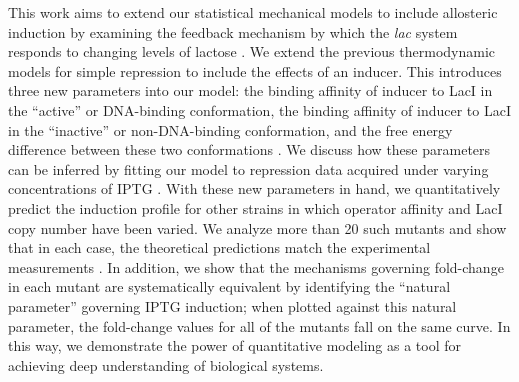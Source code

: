 This work aims to extend our statistical mechanical models to include
allosteric induction by examining the
feedback mechanism by which the \textit{lac} system responds to changing levels
of lactose \cite{JACOB1961}. We extend the previous thermodynamic models for
simple repression to include the effects of an inducer. This introduces three
new parameters into our model: the binding affinity of inducer to LacI in the
``active'' or DNA-binding conformation, the binding affinity of inducer to LacI
in the ``inactive'' or non-DNA-binding conformation, and the free energy
difference between these two conformations . We discuss how these parameters can
be inferred by fitting our model to repression data acquired under varying
concentrations of IPTG . With these new parameters in hand, we quantitatively
predict the induction profile for other strains in which operator affinity and
LacI copy number have been varied. We analyze more than 20 such mutants and show
that in each case, the theoretical predictions match the experimental
measurements . In addition, we show that the mechanisms governing fold-change in
each mutant are systematically equivalent by identifying the ``natural
parameter'' governing IPTG induction; when plotted against this natural
parameter, the fold-change values for all of the mutants fall on the same curve.
In this way, we demonstrate the power of quantitative modeling as a tool for
achieving deep understanding of biological systems. 

